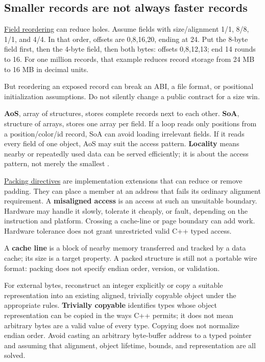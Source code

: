 \subsection{Smaller records are not always faster records}\label{01-foundations-i-ch002-smaller-records-are-not-always-faster-records}

\hypertarget{01-foundations-i-ch002-smaller-records-are-not-always-faster-records}{}

\hyperref[appendix-5522ad176ca0]{Field reordering} can reduce holes. Assume fields with size/alignment 1/1, 8/8, 1/1, and 4/4. In that order, offsets are 0,8,16,20, ending at 24. Put the 8-byte field first, then the 4-byte field, then both bytes: offsets 0,8,12,13; end 14 rounds to 16. For one million records, that example reduces record storage from 24 MB to 16 MB in decimal units.

But reordering an exposed record can break an ABI, a file format, or positional initialization assumptions. Do not silently change a public contract for a size win.

\textbf{AoS}, array of structures, stores complete records next to each other. \textbf{SoA}, structure of arrays, stores one array per field. If a loop reads only positions from a position/color/id record, SoA can avoid loading irrelevant fields. If it reads every field of one object, AoS may suit the access pattern. \textbf{Locality} means nearby or repeatedly used data can be served efficiently; it is about the access pattern, not merely the smallest .

\hyperref[appendix-0682dbfc5f0e]{Packing directives} are implementation extensions that can reduce or remove padding. They can place a member at an address that fails its ordinary alignment requirement. A \textbf{misaligned access} is an access at such an unsuitable boundary. Hardware may handle it slowly, tolerate it cheaply, or fault, depending on the instruction and platform. Crossing a cache-line or page boundary can add work. Hardware tolerance does not grant unrestricted valid C++ typed access.

A \textbf{cache line} is a block of nearby memory transferred and tracked by a data cache; its size is a target property. A packed structure is still not a portable wire format: packing does not specify endian order, version, or validation.

For external bytes, reconstruct an integer explicitly or copy a suitable representation into an existing aligned, trivially copyable object under the appropriate rules. \textbf{Trivially copyable} identifies types whose object representation can be copied in the ways C++ permits; it does not mean arbitrary bytes are a valid value of every type. Copying does not normalize endian order. Avoid casting an arbitrary byte-buffer address to a typed pointer and assuming that alignment, object lifetime, bounds, and representation are all solved.

